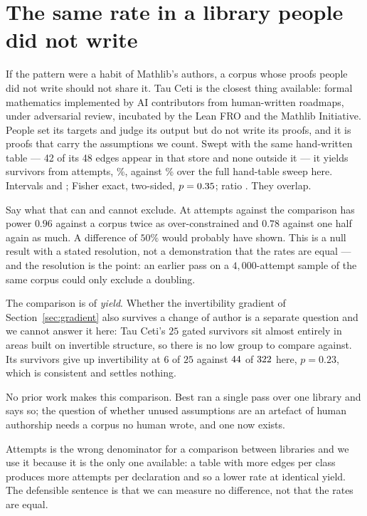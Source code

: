 \documentclass[11pt]{article}
\begin{document}
\section{The same rate in a library people did not write}\label{sec:tauceti}

If the pattern were a habit of Mathlib's authors, a corpus whose proofs people
did not write should not share it. Tau Ceti \cite{tauceti} is the closest thing
available: formal mathematics implemented by AI contributors from human-written
roadmaps, under adversarial review, incubated by the Lean FRO and the Mathlib
Initiative. People set its targets and judge its output but do not write its
proofs, and it is proofs that carry the assumptions we count. Swept with the same hand-written table --- 42 of its 48 edges appear in that
store and none outside it --- it yields \tauSurvivors{} survivors from
\tauAttempts{} attempts, \tauYield{}\%, against \allYield{}\% over the full
hand-table sweep here. Intervals \tauYieldCI{} and \allYieldCI{}; Fisher exact,
two-sided, $p = 0.35{}$; ratio \tauRatio{}. They overlap.

Say what that can and cannot exclude. At \tauAttempts{} attempts against
\allAttempts{} the comparison has power $0.96$ against a corpus twice as
over-constrained and $0.78$ against one half again as much. A difference of
$50\%$ would probably have shown. This is a null result with a stated
resolution, not a demonstration that the rates are equal --- and the resolution
is the point: an earlier pass on a $4{,}000$-attempt sample of the same corpus
could only exclude a doubling.

The comparison is of \emph{yield}. Whether the invertibility gradient of
Section~\ref{sec:gradient} also survives a change of author is a separate
question and we cannot answer it here: Tau Ceti's \(25\) gated survivors sit
almost entirely in areas built on invertible structure, so there is no low group
to compare against. Its survivors give up invertibility at \(6\) of \(25\)
against \(44{}\) of \(322{}\) here, $p = 0.23$, which is
consistent and settles nothing.

No prior work makes this comparison. Best ran a single pass over one library and
says so; the question of whether unused assumptions are an artefact of human
authorship needs a corpus no human wrote, and one now exists.

Attempts is the wrong denominator for a comparison between libraries and we use
it because it is the only one available: a table with more edges per class
produces more attempts per declaration and so a lower rate at identical yield.
The defensible sentence is that we can measure no difference, not that the rates
are equal.
\end{document}
